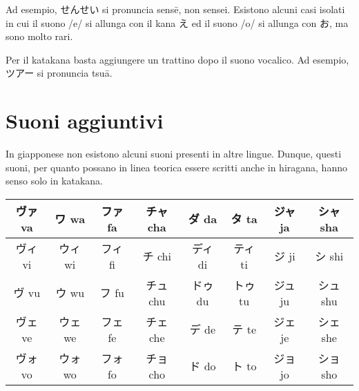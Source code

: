 \documentclass{article}
\begin{document}
        Ad esempio, \textjapanese{せんせい} si pronuncia \textjapanese{sensē}, non \textjapanese{sensei}. Esistono
        alcuni casi isolati in cui il suono \textjapanese{/e/} si allunga con il kana \textjapanese{え} ed il suono
        \textjapanese{/o/} si allunga con \textjapanese{お}, ma sono molto rari.

        Per il katakana basta aggiungere un trattino dopo il suono vocalico. Ad esempio, \textjapanese{ツアー} si
        pronuncia \textjapanese{tsuā}.

    \section{Suoni aggiuntivi}

        In giapponese non esistono alcuni suoni presenti in altre lingue. Dunque, questi suoni, per quanto possano
        in linea teorica essere scritti anche in hiragana, hanno senso solo in katakana.

        \begin{center}
            \begin{japanese}
                \begin{tabular}{|c|c|c|c|c|c|c|c|}
                    \hline
                    ヴァ va & ワ wa & ファ fa & チャ cha & ダ da & タ ta & ジャ ja & シャ sha\\
                    \hline
                    ヴィ vi & ウィ wi & フィ fi & チ chi & ディ di & ティ ti & ジ ji & シ shi\\
                    \hline
                    ヴ vu & ウ wu & フ fu & チュ chu & ドゥ du & トゥ tu & ジュ ju & シュ shu\\
                    \hline
                    ヴェ ve & ウェ we & フェ fe & チェ che & デ de & テ te & ジェ je & シェ she\\
                    \hline
                    ヴォ vo & ウォ wo & フォ fo & チョ cho & ド do & ト to & ジョ jo & ショ sho\\
                    \hline
                \end{tabular}
            \end{japanese}
        \end{center}
\end{document}
